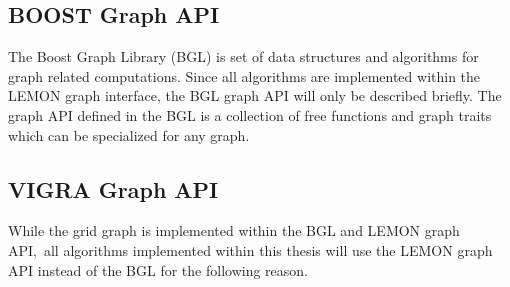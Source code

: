 

\subsection{BOOST Graph API}\label{sec:boost_graph_apis}
The Boost Graph Library (BGL)  \cite{software_bgl} is set of data structures and 
algorithms for graph related computations.
Since all algorithms are implemented within the LEMON graph interface, 
the BGL graph API will only be described briefly.
The graph API defined in the BGL is a collection of
free functions and graph traits which can be specialized for
any graph.




\subsection{VIGRA Graph API}

While the grid graph is implemented within the BGL and LEMON graph API,\
all algorithms implemented within this thesis will
use the LEMON graph API instead of the BGL 
for the following reason.

